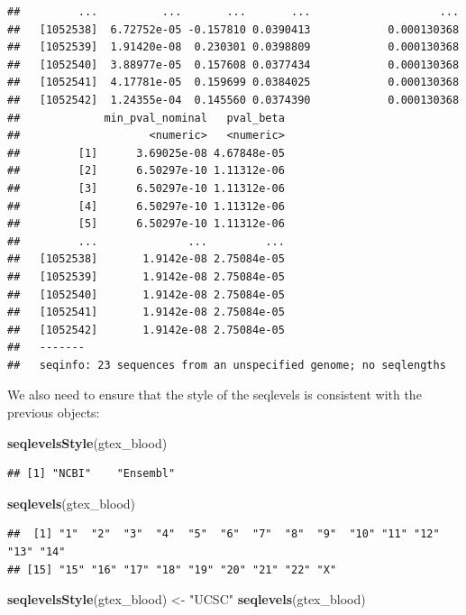 \documentclass[9pt,a4paper,]{extarticle}
\newenvironment{Shaded}{\begin{snugshade}}{\end{snugshade}}
\newcommand{\KeywordTok}[1]{\textcolor[rgb]{0.13,0.29,0.53}{\textbf{#1}}}
\newcommand{\StringTok}[1]{\textcolor[rgb]{0.31,0.60,0.02}{#1}}
\newcommand{\NormalTok}[1]{#1}
\begin{document}
\begin{verbatim}
##         ...          ...       ...       ...                    ...
##   [1052538]  6.72752e-05 -0.157810 0.0390413            0.000130368
##   [1052539]  1.91420e-08  0.230301 0.0398809            0.000130368
##   [1052540]  3.88977e-05  0.157608 0.0377434            0.000130368
##   [1052541]  4.17781e-05  0.159699 0.0384025            0.000130368
##   [1052542]  1.24355e-04  0.145560 0.0374390            0.000130368
##             min_pval_nominal   pval_beta
##                    <numeric>   <numeric>
##         [1]      3.69025e-08 4.67848e-05
##         [2]      6.50297e-10 1.11312e-06
##         [3]      6.50297e-10 1.11312e-06
##         [4]      6.50297e-10 1.11312e-06
##         [5]      6.50297e-10 1.11312e-06
##         ...              ...         ...
##   [1052538]       1.9142e-08 2.75084e-05
##   [1052539]       1.9142e-08 2.75084e-05
##   [1052540]       1.9142e-08 2.75084e-05
##   [1052541]       1.9142e-08 2.75084e-05
##   [1052542]       1.9142e-08 2.75084e-05
##   -------
##   seqinfo: 23 sequences from an unspecified genome; no seqlengths
\end{verbatim}

We also need to ensure that the style of the seqlevels is consistent with the previous objects:

\begin{Shaded}
\begin{Highlighting}[]
\KeywordTok{seqlevelsStyle}\NormalTok{(gtex_blood)}
\end{Highlighting}
\end{Shaded}

\begin{verbatim}
## [1] "NCBI"    "Ensembl"
\end{verbatim}

\begin{Shaded}
\begin{Highlighting}[]
\KeywordTok{seqlevels}\NormalTok{(gtex_blood)}
\end{Highlighting}
\end{Shaded}

\begin{verbatim}
##  [1] "1"  "2"  "3"  "4"  "5"  "6"  "7"  "8"  "9"  "10" "11" "12" "13" "14"
## [15] "15" "16" "17" "18" "19" "20" "21" "22" "X"
\end{verbatim}

\begin{Shaded}
\begin{Highlighting}[]
\KeywordTok{seqlevelsStyle}\NormalTok{(gtex_blood) <-}\StringTok{ "UCSC"}
\KeywordTok{seqlevels}\NormalTok{(gtex_blood)}
\end{Highlighting}
\end{Shaded}
\end{document}
